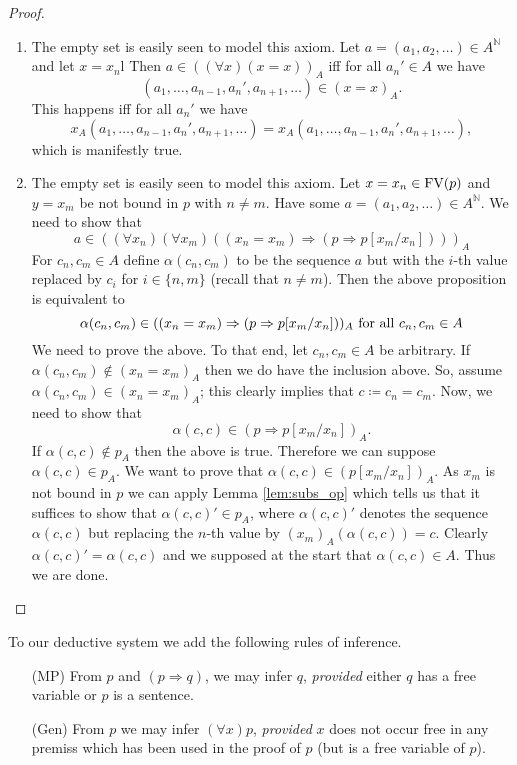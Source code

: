 \documentclass{report}
\theoremstyle{definition}
\theoremstyle{plain}
\theoremstyle{definition}
\begin{document}
\begin{proof}
\begin{enumerate}
			\item The empty set is easily seen to model this axiom. Let $a =(a_1,a_2,\ldots)\in A^{\mathbb{N}}$ and let $x = x_n$l Then $a\in ((\forall x)(x=x))_A$ iff for all $a_n'\in A$ we have
			\[
			(a_1, \ldots, a_{n-1}, a_{n}',a_{n+1},\ldots) \in (x=x)_A.
			\]	
			This happens iff for all $a_n'$ we have
			\[
			x_A(a_1, \ldots, a_{n-1}, a_{n}',a_{n+1},\ldots) = x_A(a_1, \ldots, a_{n-1}, a_{n}',a_{n+1},\ldots),
			\]
			which is manifestly true. 
			\item The empty set is easily seen to model this axiom. Let $x = x_n\in \textnormal{FV}(p)$ and $y = x_m$ be not bound in $p$ with $n\neq m$. Have some $a =(a_1,a_2,\ldots)\in A^{\mathbb{N}}$. We need to show that 
			\[
			a\in ((\forall x_n)(\forall x_m) ((x_n= x_m) \Rightarrow (p \Rightarrow p[x_m/x_n])))_A
			\]
			For $c_n,c_m \in A$ define $\alpha(c_n,c_m)$ to be the sequence $a$ but with the $i$-th value replaced by $c_i$ for $i\in \{n,m\}$ (recall that $n\neq m$). Then the above proposition is equivalent to
			\[
			\alpha(c_n,c_m) \in ((x_n= x_m) \Rightarrow (p \Rightarrow p[x_m/x_n]))_A \textnormal{ for all }c_n,c_m\in A
			\]
			We need to prove the above. To that end, let $c_n,c_m\in A$ be arbitrary. If $\alpha(c_n, c_m)\notin (x_n = x_m)_A$ then we do have the inclusion above. So, assume $\alpha(c_n,c_m)\in (x_n = x_m)_A$; this clearly implies that $c \coloneqq c_n = c_m$. Now, we need to show that 
			\[
			\alpha(c,c) \in (p \Rightarrow p[x_m/x_n])_A.
			\]
			If $\alpha(c,c)\notin p_A$ then the above is true. Therefore we can suppose $\alpha(c,c)\in p_A$. We want to prove that $\alpha(c,c)\in (p[x_m/x_n])_A$. As $x_m$ is not bound in $p$ we can apply Lemma \ref{lem:subs_op} which tells us that it suffices to show that $\alpha(c,c)' \in p_A$, where $\alpha(c,c)'$ denotes the sequence $\alpha(c,c)$ but replacing the $n$-th value by $(x_m)_A(\alpha(c,c)) = c$. Clearly $\alpha(c,c)' = \alpha(c,c)$ and we supposed at the start that $\alpha(c,c)\in A$. Thus we are done.
		\end{enumerate}
	\end{proof}
	To our deductive system we add the following rules of inference.
	\begin{enumerate}
		\item[(MP)] From $p$ and $(p\Rightarrow q)$, we may infer $q$, \emph{provided} either $q$ has a free variable or $p$ is a sentence.
		\item [(Gen)] From $p$ we may infer $(\forall x) p$, \emph{provided} $x$ does not occur free in any premiss which has been used in the proof of $p$ (but is a free variable of $p$).
	\end{enumerate}
\end{document}
